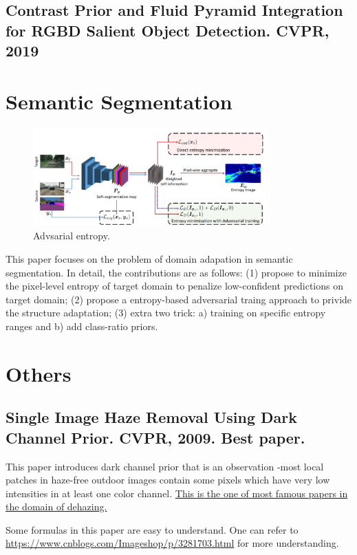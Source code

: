 \documentclass[10pt,onecolumn]{book}
\begin{document}
\section{Contrast Prior and Fluid Pyramid Integration for RGBD Salient Object Detection. CVPR, 2019}

\chapter{Semantic Segmentation}
\begin{figure}[h]
\centering
\includegraphics[width=0.8\textwidth]{figures_paper_reading/ADVENT_Adversarial_Entropy_Minimization_for_Domain_Adaptation_in_Semantic_Segmentation_CVPR2019.png}
\caption{Advsarial entropy.}
\label{fig}
\end{figure}
This paper focuses on the problem of domain adapation in semantic segmentation. In detail, the contributions are as follows: (1) propose to minimize the pixel-level entropy of target domain to penalize low-confident predictions on target domain; (2) propose a entropy-based adversarial traing approach to privide the structure adaptation; (3) extra two trick: a) training on specific entropy ranges and b) add class-ratio priors.

\chapter{Others}
\section{Single Image Haze Removal Using Dark Channel Prior. CVPR, 2009. Best paper.}
This paper introduces dark channel prior that is an observation -most local patches in haze-free outdoor images contain some pixels which have very low intensities in at least one color channel. \uline{This is the one of most famous papers in the domain of dehazing.} 

Some formulas in this paper are easy to understand. One can refer to \url{https://www.cnblogs.com/Imageshop/p/3281703.html} for more understanding. 
\end{document}

